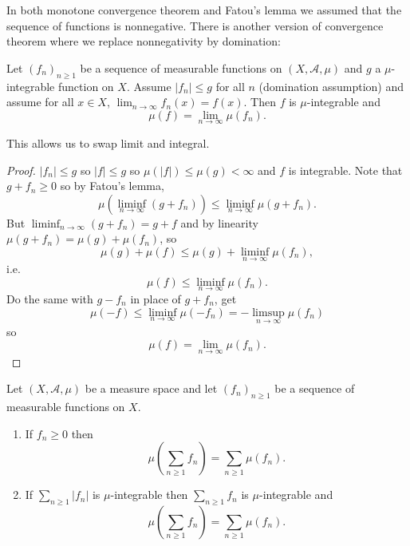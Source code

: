 \documentclass[a4paper]{article}
\begin{document}
In both monotone convergence theorem and Fatou's lemma we assumed that the sequence of functions is nonnegative. There is another version of convergence theorem where we replace nonnegativity by domination:

\begin{theorem}
  Let \((f_n)_{n \geq 1}\) be a sequence of measurable functions on \((X, \mathcal A, \mu)\) and \(g\) a \(\mu\)-integrable function on \(X\). Assume \(|f_n| \leq g\) for all \(n\) (domination assumption) and assume for all \(x \in X\), \(\lim_{n \to \infty} f_n(x) = f(x)\). Then \(f\) is \(\mu\)-integrable and
  \[
    \mu(f) = \lim_{n \to \infty} \mu(f_n).
  \]
\end{theorem}

This allows us to swap limit and integral.

\begin{proof}
  \(|f_n| \leq g\) so \(|f| \leq g\) so \(\mu(|f|) \leq \mu(g) < \infty\) and \(f\) is integrable. Note that \(g + f_n \geq 0\) so by Fatou's lemma,
  \[
    \mu(\liminf_{n \to \infty} (g + f_n)) \leq \liminf_{n \to \infty} \mu(g + f_n).
  \]
  But \(\liminf_{n \to \infty} (g + f_n) = g + f\) and by linearity \(\mu(g + f_n) = \mu(g) + \mu(f_n)\), so
  \[
    \mu(g) + \mu(f) \leq \mu(g) + \liminf_{n \to \infty} \mu(f_n),
  \]
  i.e.
  \[
    \mu(f) \leq \liminf_{n \to \infty} \mu(f_n).
  \]
  Do the same with \(g - f_n\) in place of \(g + f_n\), get
  \[
    \mu(-f) \leq \liminf_{n \to \infty} \mu(-f_n) = - \limsup_{n \to \infty} \mu(f_n)
  \]
  so
  \[
    \mu(f) = \lim_{n \to \infty} \mu(f_n).
  \]
\end{proof}

\begin{corollary}
  Let \((X, \mathcal A, \mu)\) be a measure space and let \((f_n)_{n \geq 1}\) be a sequence of measurable functions on \(X\).
  \begin{enumerate}
  \item If \(f_n \geq 0\) then
    \[
      \mu(\sum_{n \geq 1} f_n) = \sum_{n \geq 1} \mu(f_n).
    \]
  \item If \(\sum_{n \geq 1} |f_n|\) is \(\mu\)-integrable then \(\sum_{n \geq 1} f_n\) is \(\mu\)-integrable and
    \[
      \mu(\sum_{n \geq 1} f_n) = \sum_{n \geq 1} \mu(f_n).
    \]
  \end{enumerate}
\end{corollary}
\end{document}
